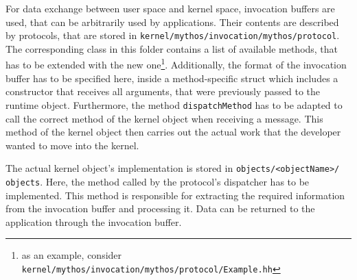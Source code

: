 For data exchange between user space and kernel space, invocation buffers are
used, that can be arbitrarily used by applications. Their contents are
described by protocols, that are stored in
\texttt{kernel/mythos/invocation/mythos/protocol}. The corresponding class in
this folder contains a list of available methods, that has to be extended with
the new one\footnote{as an example, consider
\texttt{kernel/mythos/invocation/mythos/protocol/Example.hh}}. Additionally,
the format of the invocation buffer has to be specified here, inside a
method-specific struct which includes a constructor that receives all
arguments, that were previously passed to the runtime object.  Furthermore, the
method \texttt{dispatchMethod} has to be adapted to call the correct method of
the kernel object when receiving a message. This method of the kernel object
then carries out the actual work that the developer wanted to move into the
kernel.

The actual kernel object's implementation is stored in
\texttt{objects/<objectName>/\\objects}. Here, the method called by the
protocol's dispatcher has to be implemented. This method is responsible for
extracting the required information from the invocation buffer and processing
it. Data can be returned to the application through the invocation buffer.

% 
% 


